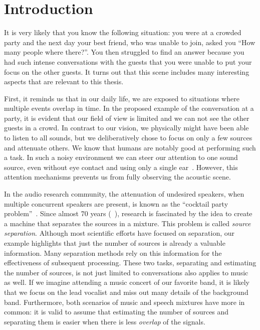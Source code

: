 \chapter{Introduction}\label{ch:introduction}

It is very likely that you know the following situation: you were at a crowded party and the next day your best friend, who was unable to join, asked you ``How many people where there?''.
You then struggled to find an answer because you had such intense conversations with the guests that you were unable to put your focus on the other guests.
It turns out that this scene includes many interesting aspects that are relevant to this thesis.
\par
First, it reminds us that in our daily life, we are exposed to situations where multiple events overlap in time.
In the proposed example of the conversation at a party, it is evident that our field of view is limited and we can not see the other guests in a crowd.
In contrast to our vision, we physically might have been able to listen to all sounds, but we deliberatively chose to focus on only a few sources and attenuate others.
We know that humans are notably good at performing such a task.
In such a noisy environment we can steer our attention to one sound source, even without eye contact and using only a single ear~\cite{bregman90}.
However, this attention mechanisms prevents us from fully observing the acoustic scene.
\par
In the audio research community, the attenuation of undesired speakers, when multiple concurrent speakers are present, is known as the ``cocktail party problem''~\cite{haykin05}.
Since almost 70 years (~\cite{cherry53}), research is fascinated by the idea to create a machine that separates the sources in a mixture.
This problem is called \emph{source separation}.
Although most scientific efforts have focused on separation, our example highlights that just the number of sources is already a valuable information.
Many separation methods rely on this information for the effectiveness of subsequent processing.
These two tasks, separating and estimating the number of sources, is not just limited to conversations also applies to music as well.
If we imagine attending a music concert of our favorite band, it is likely that we focus on the lead vocalist and miss out many details of the background band.
Furthermore, both scenarios of music and speech mixtures have more in common: it is valid to assume that estimating the number of sources and separating them is easier when there is less \emph{overlap} of the signals.
